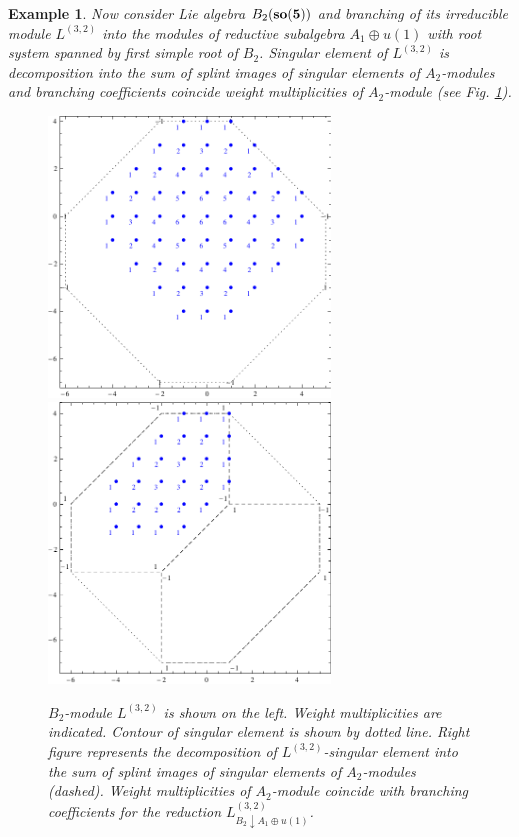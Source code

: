 \documentclass[12pt]{article}
\newtheorem{example}{Example}
\begin{document}
\begin{example}
  Now consider Lie algebra $B_{2} (\bf{so}(5))$ and branching of its irreducible module $L^{(3,2)}$ into the modules of reductive subalgebra $A_{1}\oplus u(1)$ with root system spanned by first simple root of $B_{2}$. Singular element of $L^{(3,2)}$ is decomposition into the sum of splint images of singular elements of $A_{2}$-modules and branching coefficients coincide weight multiplicities of $A_{2}$-module (see Fig. \ref{fig:b2_splint}).

  \begin{figure}[h!bt]
  \hspace*{-1.5cm}

   \includegraphics[width=75mm]{b2}
   \includegraphics[width=75mm]{b2-a2-a1}
  \caption{$B_{2}$-module $L^{(3,2)}$ is shown on the left. Weight multiplicities are indicated. Contour of singular element is shown by dotted line. Right figure represents the decomposition of  $L^{(3,2)}$-singular element into the sum of splint images of singular elements of $A_{2}$-modules (dashed). Weight multiplicities of $A_{2}$-module coincide with branching coefficients for the reduction $L^{(3,2)}_{B_{2}\downarrow A_{1}\oplus u(1)}$.}

 \label{fig:b2_splint}
\end{figure}
\end{example}
\end{document}
